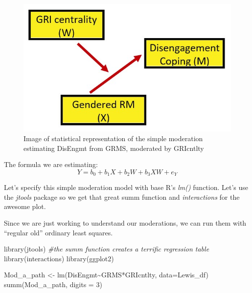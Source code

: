 \documentclass[
  english,
]{book}
\newenvironment{Shaded}{\begin{snugshade}}{\end{snugshade}}
\newcommand{\AttributeTok}[1]{\textcolor[rgb]{0.77,0.63,0.00}{#1}}
\newcommand{\CommentTok}[1]{\textcolor[rgb]{0.56,0.35,0.01}{\textit{#1}}}
\newcommand{\DecValTok}[1]{\textcolor[rgb]{0.00,0.00,0.81}{#1}}
\newcommand{\FunctionTok}[1]{\textcolor[rgb]{0.00,0.00,0.00}{#1}}
\newcommand{\NormalTok}[1]{#1}
\newcommand{\OtherTok}[1]{\textcolor[rgb]{0.56,0.35,0.01}{#1}}
\newcommand{\SpecialCharTok}[1]{\textcolor[rgb]{0.00,0.00,0.00}{#1}}
\begin{document}
\begin{figure}
\centering
\includegraphics{images/ModMed/LewisMod1.jpg}
\caption{Image of statistical representation of the simple moderation estimating DisEngmt from GRMS, moderated by GRIcntlty}
\end{figure}

The formula we are estimating:
\[Y=b_{0}+b_{1}X+b_{2}W+b_{3}XW+e_{Y}\]

Let's specify this simple moderation model with base R's \emph{lm()} function. Let's use the \emph{jtools} package so we get that great summ function and \emph{interactions} for the awesome plot.

Since we are just working to understand our moderations, we can run them with ``regular old'' ordinary least squares.

\begin{Shaded}
\begin{Highlighting}[]
\FunctionTok{library}\NormalTok{(jtools) }\CommentTok{\#the summ function creates a terrific regression table}
\FunctionTok{library}\NormalTok{(interactions)}
\FunctionTok{library}\NormalTok{(ggplot2)}

\NormalTok{Mod\_a\_path }\OtherTok{\textless{}{-}} \FunctionTok{lm}\NormalTok{(DisEngmt}\SpecialCharTok{\textasciitilde{}}\NormalTok{GRMS}\SpecialCharTok{*}\NormalTok{GRIcntlty, }\AttributeTok{data=}\NormalTok{Lewis\_df)}
\FunctionTok{summ}\NormalTok{(Mod\_a\_path, }\AttributeTok{digits =} \DecValTok{3}\NormalTok{)}
\end{Highlighting}
\end{Shaded}
\end{document}
